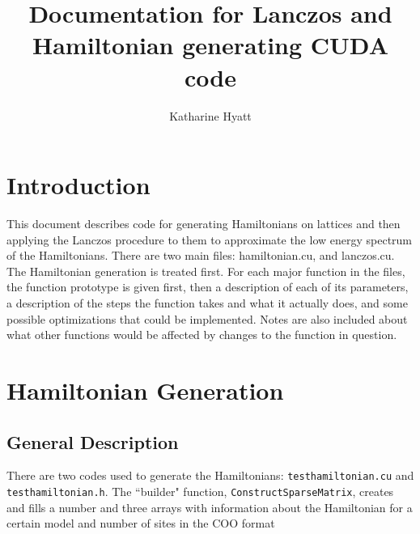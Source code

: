 \documentclass{article}
\author{Katharine Hyatt}
\title{Documentation for Lanczos and Hamiltonian generating CUDA code}
\begin{document}
\renewcommand{\int}{\textcolor{Green}{int $\,$}}
\newcommand{\ptrint}{\textcolor{Green}{int $^\ast \,$}}
\newcommand{\const}{\textcolor{Green}{const $\,$}}
\newcommand{\double}{\textcolor{Green}{double $\,$}}
\newcommand{\void}{\textcolor{Green}{void $\,$}}
\newcommand{\typeinttwoptr}{\textcolor{Green}{int2$^\ast \,$}}
\newcommand{\cuDoubleComplex}{\textcolor{Green}{cuDoubleComplex$^\ast \,$}}
\newcommand{\hamstruct}{\textcolor{Green}{hamstruct$^\ast \,$}}
\newcommand{\host}{\textcolor{Red}{$\_\_$host$\_\_ \; \;$}}
\newcommand{\cudaglobal}{\textcolor{Red}{$\_\_$global$\_\_ \; \;$}}
\newcommand{\device}{\textcolor{Red}{$\_\_$device$\_\_ \; \;$}}

\begin{titlepage}
\maketitle
\end{titlepage}

\section{Introduction}

This document describes code for generating Hamiltonians on lattices and then applying the Lanczos procedure to them to approximate the low energy spectrum of the Hamiltonians. There are two main files: hamiltonian.cu, and lanczos.cu. The Hamiltonian generation is treated first. For each major function in the files, the function prototype is given first, then a description of each of its parameters, a description of the steps the function takes and what it actually does, and some possible optimizations that could be implemented. Notes are also included about what other functions would be affected by changes to the function in question.

\section{Hamiltonian Generation}

\subsection{General Description}

There are two codes used to generate the Hamiltonians: \texttt{testhamiltonian.cu} and \texttt{testhamiltonian.h}. 
The ``builder" function, \texttt{ConstructSparseMatrix}, creates and fills a number and three arrays with information about the Hamiltonian for a certain model and number of sites in the COO format
\end{document}
